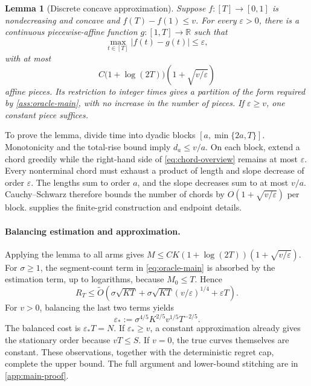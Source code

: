 \documentclass[11pt]{article}
\newtheorem{lemma}[lemma]{Lemma}
\theoremstyle{remark}
\newcommand{\R}{\mathbb R}
\begin{document}
\begin{samepage}
\begin{lemma}[Discrete concave approximation]\label{lem:approx-main}
Suppose $f:[T]\to[0,1]$ is nondecreasing and concave and $f(T)-f(1)\le v$. For every $\varepsilon>0$, there is a continuous piecewise-affine function $g:[1,T]\to\R$ such that
\[
\max_{t\in[T]}|f(t)-g(t)|\le\varepsilon,
\]
with at most
\begin{equation}\label{eq:approx-count-main}
C\bigl(1+\log(2T)\bigr)\left(1+\sqrt{v/\varepsilon}\right)
\end{equation}
affine pieces. Its restriction to integer times gives a partition of the form required by \cref{ass:oracle-main}, with no increase in the number of pieces. If $\varepsilon\ge v$, one constant piece suffices.
\end{lemma}
\end{samepage}

To prove the lemma, divide time into dyadic blocks $[a,\min\{2a,T\}]$. Monotonicity and the total-rise bound imply $d_a\le v/a$. On each block, extend a chord greedily while the right-hand side of \eqref{eq:chord-overview} remains at most $\varepsilon$. Every nonterminal chord must exhaust a product of length and slope decrease of order $\varepsilon$. The lengths sum to order $a$, and the slope decreases sum to at most $v/a$. Cauchy--Schwarz therefore bounds the number of chords by $O(1+\sqrt{v/\varepsilon})$ per block.  supplies the finite-grid construction and endpoint details.

\paragraph{Balancing estimation and approximation.}
Applying the lemma to all arms gives
$M\le CK(1+\log(2T))(1+\sqrt{v/\varepsilon})$.
For $\sigma\ge1$, the segment-count term in \eqref{eq:oracle-main} is absorbed by the estimation term, up to logarithms, because $M_0\le T$. Hence
\begin{equation}\label{eq:balance-overview}
R_T\le\widetilde O\!\left(
\sigma\sqrt{KT}
+\sigma\sqrt{KT}(v/\varepsilon)^{1/4}
+\varepsilon T\right).
\end{equation}
For $v>0$, balancing the last two terms yields
\begin{equation}\label{eq:eps-star-main}
\varepsilon_*:=\sigma^{4/5}K^{2/5}v^{1/5}T^{-2/5}.
\end{equation}
The balanced cost is $\varepsilon_*T=N$. If $\varepsilon_*\ge v$, a constant approximation already gives the stationary order because $vT\le S$. If $v=0$, the true curves themselves are constant. These observations, together with the deterministic regret cap, complete the upper bound. The full argument and lower-bound stitching are in \cref{app:main-proof}.
\end{document}
